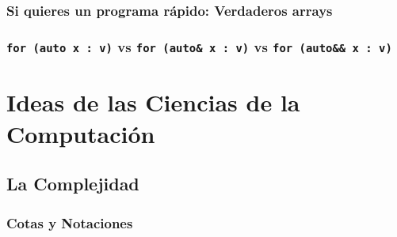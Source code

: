 \documentclass[12pt, fleqn]{report}                             %
\theoremstyle{break}                                            %
\begin{document}
            \cite{ModernCppWhatYouNeedToKnow}

        \clearpage
        \section{Si quieres un programa rápido: Verdaderos arrays}  
        
        \clearpage
        \section{ \texttt{for (auto x : v)} vs \texttt{for (auto\& x : v)} vs \texttt{for (auto\&\& x : v)} }  
            




\part{Ideas de las Ciencias de la Computación}
    

    \clearpage
    \chapter{La Complejidad}

        \section{Cotas y Notaciones}
\end{document}
